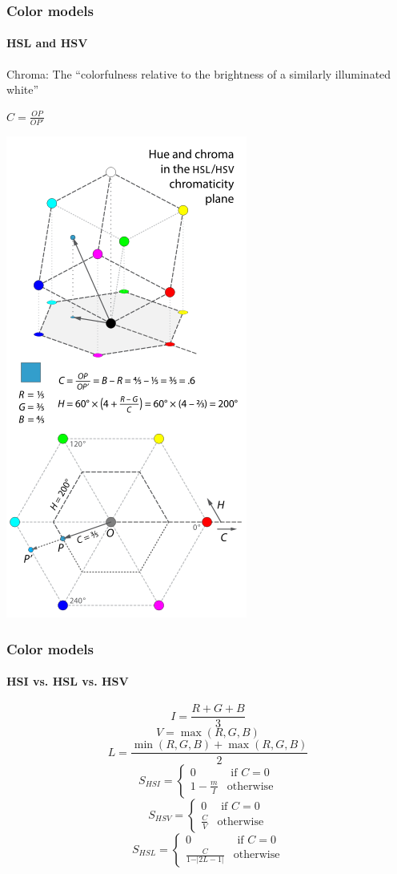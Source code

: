 \documentclass{beamer}
\begin{document}
\begin{frame}
\frametitle{Color models}
\framesubtitle{HSL and HSV}
\begin{itemize}
\footnotesize{
	\item Chroma: The ``colorfulness relative to the brightness of a similarly illuminated white''
	\item $C = \frac{OP}{OP'}$ 
	\item[]
	\begin{center}
	\includegraphics[height = 0.6\textheight]{images/L6_ChromaH.png}
	\end{center}
		}
\end{itemize}
\end{frame}
\begin{frame}
\frametitle{Color models}
\framesubtitle{HSI vs. HSL vs. HSV}
\footnotesize{
$$ I = \frac{R+G+B}{3}$$
$$ V = \max(R,G,B)$$
$$ L = \frac{\min(R,G,B) + \max(R,G,B)}{2} $$
$$ S_{HSI} = 
\begin{cases}
0 & \text{ if  } C = 0\\
1- \frac{m}{I} & \text{otherwise}
\end{cases} $$ 
$$ S_{HSV} = 
\begin{cases}
0 & \text{ if  } C = 0\\
\frac{C}{V} & \text{otherwise}
\end{cases}$$   
$$ S_{HSL} = 
\begin{cases}
0 & \text{  if  } C = 0\\
\frac{C}{1-\vert 2L - 1\vert} & \text{otherwise}
\end{cases} $$
}
\end{frame}
\end{document}
